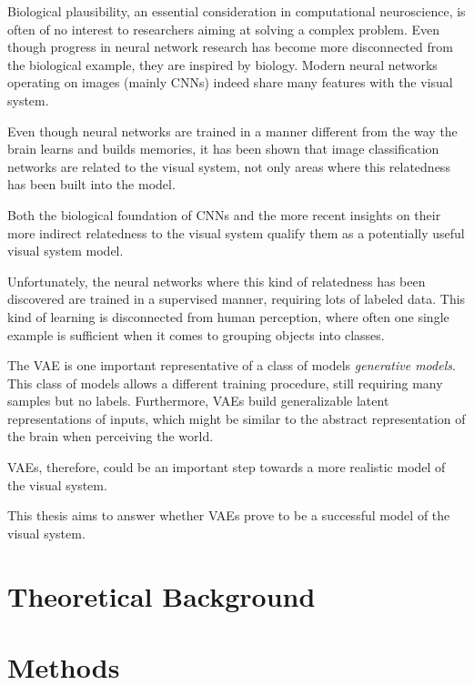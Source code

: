 \documentclass[11pt]{article}
\let\oldsection\section
\renewcommand\section{\clearpage\oldsection}
\begin{document}
Biological plausibility, an essential consideration in computational neuroscience, is often of no interest to researchers aiming at solving a complex problem.
Even though progress in neural network research has become more disconnected from the biological example, they are inspired by biology.
Modern neural networks operating on images (mainly \acp{CNN}) indeed share many features with the visual system.

Even though neural networks are trained in a manner different from the way the brain learns and builds memories, it has been shown that image classification networks are related to the visual system, not only areas where this relatedness has been built into the model.

Both the biological foundation of \acp{CNN} and the more recent insights on their more indirect relatedness to the visual system qualify them as a potentially useful visual system model.

Unfortunately, the neural networks where this kind of relatedness has been discovered are trained in a supervised manner, requiring lots of labeled data.
This kind of learning is disconnected from human perception, where often one single example is sufficient when it comes to grouping objects into classes.

The \ac{VAE} is one important representative of a class of models \textit{generative models}.
This class of models allows a different training procedure, still requiring many samples but no labels.
Furthermore, \acp{VAE} build generalizable latent representations of inputs, which might be similar to the abstract representation of the brain when perceiving the world.

\acp{VAE}, therefore, could be an important step towards a more realistic model of the visual system.

This thesis aims to answer whether \acp{VAE} prove to be a successful model of the visual system.

\acresetall
\section{Theoretical Background}\label{sec:theoretical-background}


\acresetall
\section{Methods}\label{sec:methods}


\acresetall
\end{document}
